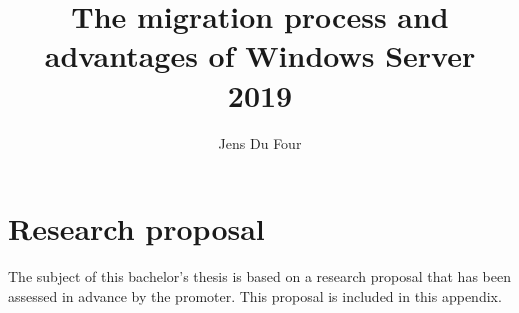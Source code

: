 \documentclass{bachproef-tin}
\title{The migration process and advantages of Windows Server 2019}
\author{Jens Du Four}
\begin{document}
\inserttitlepage
\usechapterimagefalse


\pagestyle{empty} %
\tableofcontents  %
\cleardoublepage  %
\pagestyle{fancy} %
%
%
\listoffigures
\listoftables
\printnoidxglossaries






\appendix
\renewcommand{\chaptername}{Appendix}
\chapter{Research proposal}
The subject of this bachelor's thesis is based on a research proposal that has been assessed in advance by the promoter. This proposal is included in this appendix.

%
\printbibliography[heading=bibintoc]
\end{document}
